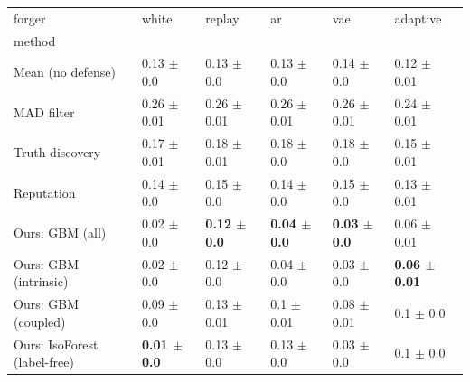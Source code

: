 \begin{tabular}{llllll}
\toprule
forger & white & replay & ar & vae & adaptive \\
method &  &  &  &  &  \\
\midrule
Mean (no defense) & 0.13 $\pm$ 0.0 & 0.13 $\pm$ 0.0 & 0.13 $\pm$ 0.0 & 0.14 $\pm$ 0.0 & 0.12 $\pm$ 0.01 \\
MAD filter & 0.26 $\pm$ 0.01 & 0.26 $\pm$ 0.01 & 0.26 $\pm$ 0.01 & 0.26 $\pm$ 0.01 & 0.24 $\pm$ 0.01 \\
Truth discovery & 0.17 $\pm$ 0.01 & 0.18 $\pm$ 0.01 & 0.18 $\pm$ 0.0 & 0.18 $\pm$ 0.0 & 0.15 $\pm$ 0.01 \\
Reputation & 0.14 $\pm$ 0.0 & 0.15 $\pm$ 0.0 & 0.14 $\pm$ 0.0 & 0.15 $\pm$ 0.0 & 0.13 $\pm$ 0.01 \\
Ours: GBM (all) & 0.02 $\pm$ 0.0 & \textbf{0.12 $\pm$ 0.0} & \textbf{0.04 $\pm$ 0.0} & \textbf{0.03 $\pm$ 0.0} & 0.06 $\pm$ 0.01 \\
Ours: GBM (intrinsic) & 0.02 $\pm$ 0.0 & 0.12 $\pm$ 0.0 & 0.04 $\pm$ 0.0 & 0.03 $\pm$ 0.0 & \textbf{0.06 $\pm$ 0.01} \\
Ours: GBM (coupled) & 0.09 $\pm$ 0.0 & 0.13 $\pm$ 0.01 & 0.1 $\pm$ 0.01 & 0.08 $\pm$ 0.01 & 0.1 $\pm$ 0.0 \\
Ours: IsoForest (label-free) & \textbf{0.01 $\pm$ 0.0} & 0.13 $\pm$ 0.0 & 0.13 $\pm$ 0.0 & 0.03 $\pm$ 0.0 & 0.1 $\pm$ 0.0 \\
\bottomrule
\end{tabular}
